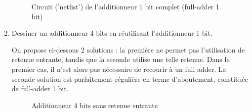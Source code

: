 \documentclass[a4paper,11pt]{article}
\begin{document}
\begin{enumerate}
\begin{figure}[!h]
  \centering
  \caption{Circuit ('netlist') de l'additionneur 1 bit complet (full-adder 1 bit)}
  \label{ha}
\end{figure}

\item Dessiner un additionneur 4 bits en réutilisant l'additionneur 1 bit.
\begin{cadre}
  On propose ci-dessous 2 solutions : la première ne permet pas l'utilisation de retenue entrante, tandis que la seconde
  utilise une telle retenue. Dans le premier cas, il n'est alors pas nécessaire de recourir à un full adder. La seconde
  solution est parfaitement régulière en terme d'aboutement, constituée de full-adder 1 bit.
\end{cadre}

\begin{figure}[!h]
  \centering
  \caption{Additionneur 4 bits sans retenue entrante}
  \label{fa}
\end{figure}


\end{enumerate}
\end{document}
